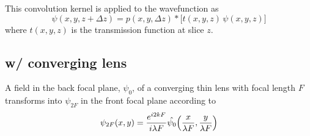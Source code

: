 \documentclass[12pt]{article}
\begin{document}
This convolution kernel is applied to the wavefunction as
\begin{equation*}
    \psi(x,y,z+\Delta z) = p(x,y,\Delta z)\ast \bigl[ t(x,y,z)\,\psi(x,y,z) \bigr]
\end{equation*}
where $t(x,y,z)$ is the transmission function at slice $z$.
\subsection{w/ converging lens}
A field in the back focal plane, $\psi_0$, of a converging thin lens with focal length $F$ transforms into $\psi_{2F}$ 
in the front focal plane according to
 \begin{equation}
    \psi_{2F}(x,y) = \frac{e^{i2kF}}{i\lambda F} \hat{\psi_0}\qty(\frac{x}{\lambda F}, \frac{y}{\lambda F})
\end{equation}
\end{document}
